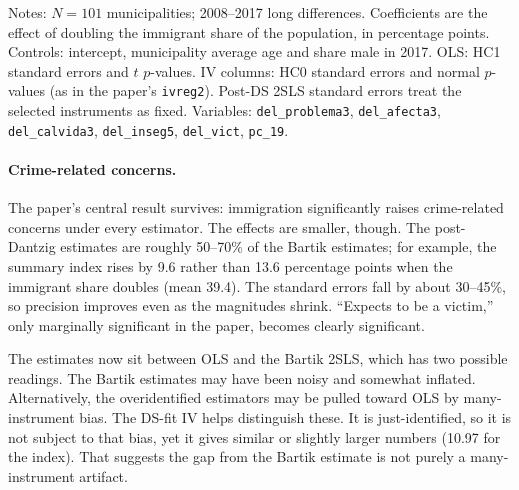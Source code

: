 \documentclass[11pt]{article}
\begin{document}
\begin{table}[htbp]
\begin{threeparttable}
\begin{tablenotes}[flushleft]
\footnotesize
\item Notes: $N = 101$ municipalities; 2008--2017 long differences. Coefficients are the
effect of doubling the immigrant share of the population, in percentage points. Controls:
intercept, municipality average age and share male in 2017. OLS: HC1 standard errors and
$t$ $p$-values. IV columns: HC0 standard errors and normal $p$-values (as in the paper's
\texttt{ivreg2}). Post-DS 2SLS standard errors treat the selected instruments as fixed.
Variables: \texttt{del\_problema3}, \texttt{del\_afecta3}, \texttt{del\_calvida3},
\texttt{del\_inseg5}, \texttt{del\_vict}, \texttt{pc\_19}.
\end{tablenotes}
\end{threeparttable}
\end{table}

\paragraph{Crime-related concerns.} The paper's central result survives: immigration
significantly raises crime-related concerns under every estimator. The effects are smaller,
though. The post-Dantzig estimates are roughly 50--70\% of the Bartik estimates; for
example, the summary index rises by 9.6 rather than 13.6 percentage points when the
immigrant share doubles (mean 39.4). The standard errors fall by about 30--45\%, so
precision improves even as the magnitudes shrink. ``Expects to be a victim,'' only
marginally significant in the paper, becomes clearly significant.

The estimates now sit between OLS and the Bartik 2SLS, which has two possible readings.
The Bartik estimates may have been noisy and somewhat inflated. Alternatively, the
overidentified estimators may be pulled toward OLS by many-instrument bias. The DS-fit IV
helps distinguish these. It is just-identified, so it is not subject to that bias, yet it
gives similar or slightly larger numbers (10.97 for the index). That suggests the gap from
the Bartik estimate is not purely a many-instrument artifact.
\end{document}
